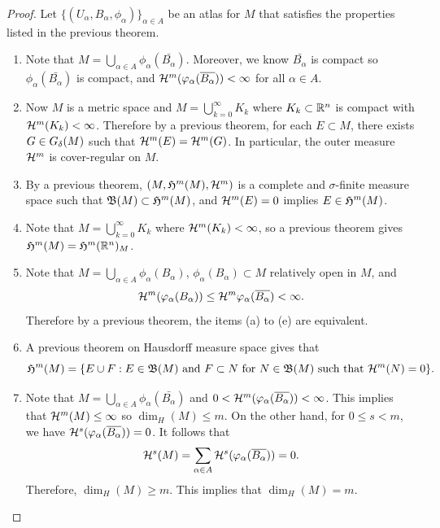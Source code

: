 \documentclass[a4paper]{article}
\renewcommand{\cupinfk}{\bigcup_{k=0}^\infty}
\begin{document}
\begin{proof}
  Let $\{(U_\alpha, B_\alpha, \phi_\alpha)\}_{\alpha \in A}$ be an atlas
  for $M$ that satisfies the properties listed in the previous theorem.
  \begin{enumerate}
    \item Note that $M = \bigcup_{\alpha \in A} \phi_\alpha
          (\bar{B_\alpha})$. Moreover, we know $\bar{B_\alpha}$ is compact
          so $\phi_\alpha (\bar{B_\alpha})$ is compact, and $\mathcal{H}^m
          (\varphi_\alpha (\overline{B_\alpha})) < \infty$ for all $\alpha \in A$.

    \item Now $M$ is a metric space and $M = \cupinfk K_k$ where $K_k
          \subset \mathbb{R}^n$ is compact with $\mathcal{H}^m (K_k) < \infty$.
          Therefore by a previous theorem, for each $E \subset M$, there
          exists $G \in G_\delta (M)$ such that $\mathcal{H}^m (E) = \mathcal{H}^m (G)$. In
          particular, the outer measure $\mathcal{H}^m$ is cover-regular on $M$.

    \item By a previous theorem, $(M, \mathfrak{H}^m (M), \mathcal{H}^m)$ is a complete
          and $\sigma$-finite measure space such that $\mathfrak{B}(M) \subset
          \mathfrak{H}^m(M)$, and $\mathcal{H}^m (E) = 0$ implies $E \in \mathfrak{H}^m(M)$.

    \item Note that $M = \cupinfk K_k$ where $\mathcal{H}^m (K_k) < \infty$, so
          a previous theorem gives $\mathfrak{H}^m (M) = \mathfrak{H}^m (\mathbb{R}^n)_M$.

    \item Note that $M = \bigcup_{\alpha \in A} \phi_\alpha (B_\alpha)$,
          $\phi_\alpha (B_\alpha) \subset M$ relatively open in $M$, and
          \[
            \mathcal{H}^m (\varphi_\alpha(B_\alpha))
            \leq \mathcal{H}^m \varphi_\alpha (\overline{B_\alpha}) < \infty.
          \]
          Therefore by a previous theorem, the items (a) to (e) are
          equivalent.

    \item A previous theorem on Hausdorff measure space gives that
          \[
            \mathfrak{H}^m (M) = \{E \cup F : \text{$E \in \mathfrak{B}(M)$
            and $F \subset N$ for $N \in \mathfrak{B}(M)$ such that
          $\mathcal{H}^m(N) = 0$}\}.
          \]

    \item Note that $M = \bigcup_{\alpha \in A} \phi_\alpha
          (\bar{B_\alpha})$ and $0 < \mathcal{H}^m (\varphi_\alpha
          (\overline{B_\alpha})) < \infty$. This implies that $\mathcal{H}^m (M) \leq
          \infty$ so $\dim_H (M) \leq m$. On the other hand, for $0 \leq s
          < m$, we have $\mathcal{H}^s(\varphi_\alpha (\overline{B_\alpha})) = 0$. It
          follows that
          \[
            \mathcal{H}^s (M)
            = \sum_{\alpha \in A} \mathcal{H}^s (\varphi_\alpha (\overline{B_\alpha}))
            = 0.
          \]
          Therefore, $\dim_H (M) \geq m$. This implies that $\dim_H (M) =
          m$.
  \end{enumerate}
\end{proof}
\end{document}
